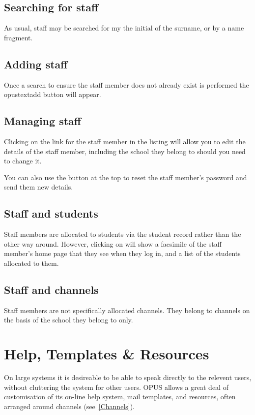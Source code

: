 \documentclass[12 pt]{book}
\begin{document}
\section{Searching for staff}

As usual, staff may be searched for my the initial of the surname, or by a
name fragment.

\section{Adding staff}

Once a search to ensure the staff member does not already exist is performed
the opustext{add} button will appear.

\section{Managing staff}

Clicking on the  link for the staff member in the listing will
allow you to edit the details of the staff member, including the school they
belong to should you need to change it.

You can also use the button at the top to reset the staff member's password and
send them new details.

\section{Staff and students}

Staff members are allocated to students via the student record rather than the
other way around. However, clicking on 
will show a facsimile of the staff member's home page that they see when they
log in, and a list of the students allocated to them.

\section{Staff and channels}

Staff members are not specifically allocated channels. They belong to channels
on the basis of the school they belong to only.

%
%
%

\chapter{Help, Templates \& Resources}

On large systems it is desireable to be able to speak directly to the
relevent users, without cluttering the system for other users. OPUS
allows a great deal of customisation of its on-line help system, mail
templates, and resources, often arranged around channels (see~\ref{Channels}).
\end{document}
